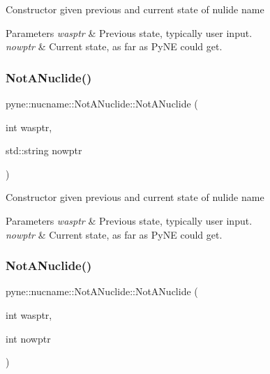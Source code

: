 Constructor given previous and current state of nulide name 
\begin{DoxyParams}{Parameters}
{\em wasptr} & Previous state, typically user input. \\
\hline
{\em nowptr} & Current state, as far as Py\+NE could get. \\
\hline
\end{DoxyParams}
\mbox{\label{classpyne_1_1nucname_1_1_not_a_nuclide_af8665194481f65e932cbd4244ee636ae}} 
\subsubsection{\texorpdfstring{Not\+A\+Nuclide()}{NotANuclide()}\hspace{0.1cm}{\footnotesize\ttfamily [3/4]}}
{\footnotesize\ttfamily pyne\+::nucname\+::\+Not\+A\+Nuclide\+::\+Not\+A\+Nuclide (\begin{DoxyParamCaption}\item[{int}]{wasptr,  }\item[{std\+::string}]{nowptr }\end{DoxyParamCaption})\hspace{0.3cm}{\ttfamily [inline]}}

Constructor given previous and current state of nulide name 
\begin{DoxyParams}{Parameters}
{\em wasptr} & Previous state, typically user input. \\
\hline
{\em nowptr} & Current state, as far as Py\+NE could get. \\
\hline
\end{DoxyParams}
\mbox{\label{classpyne_1_1nucname_1_1_not_a_nuclide_adbc9b62fa21ec1ab4957ca8a4569a8c6}} 
\subsubsection{\texorpdfstring{Not\+A\+Nuclide()}{NotANuclide()}\hspace{0.1cm}{\footnotesize\ttfamily [4/4]}}
{\footnotesize\ttfamily pyne\+::nucname\+::\+Not\+A\+Nuclide\+::\+Not\+A\+Nuclide (\begin{DoxyParamCaption}\item[{int}]{wasptr,  }\item[{int}]{nowptr }\end{DoxyParamCaption})\hspace{0.3cm}{\ttfamily [inline]}}

